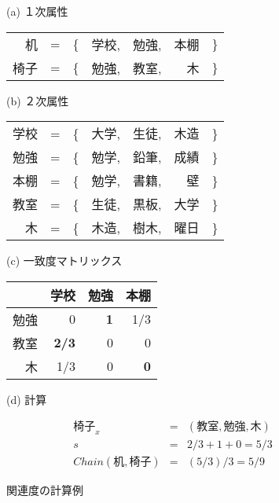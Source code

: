 \small
\begin{figure}[tb]

	\begin{center}
	(a) １次属性

	\begin{tabular}{rrrrrrr} \hline
		机   & = & \{ & 学校, & 勉強, & 本棚 & \} \\
		椅子 & = & \{ & 勉強, & 教室, & 木   & \} \\ \hline
	\end{tabular}

	\vspace{0.2cm}

	(b) ２次属性

	\begin{tabular}{rrrrrrr} \hline
		学校 & = & \{ & 大学, & 生徒, & 木造 & \} \\
		勉強 & = & \{ & 勉学, & 鉛筆, & 成績 & \} \\
		本棚 & = & \{ & 勉学, & 書籍, & 壁   & \} \\
		教室 & = & \{ & 生徒, & 黒板, & 大学 & \} \\
		木   & = & \{ & 木造, & 樹木, & 曜日 & \} \\ \hline
	\end{tabular}

	\vspace{0.2cm}

	(c) 一致度マトリックス

	\begin{tabular}{r|rrr} \hline
		   & 学校      & 勉強    & 本棚    \\ \hline
	  勉強 &    0      & {\bf 1} &  1/3    \\
	  教室 & {\bf 2/3} &    0    &    0    \\
	  木   &  1/3      &    0    & {\bf 0} \\ \hline
	\end{tabular}
	
	\vspace{0.2cm}

	(d) 計算
	
	\begin{eqnarray}
		椅子_x &=& (教室, 勉強, 木) \nonumber \\
		s &=& 2/3 + 1 + 0 = 5/3 \nonumber \\
		Chain(机,椅子) &=& (5/3)/3 = 5/9 \nonumber
	\end{eqnarray}
	
	\end{center}
	
	\caption{関連度の計算例}
	\label{Eassoc}
\end{figure}
\normalsize

